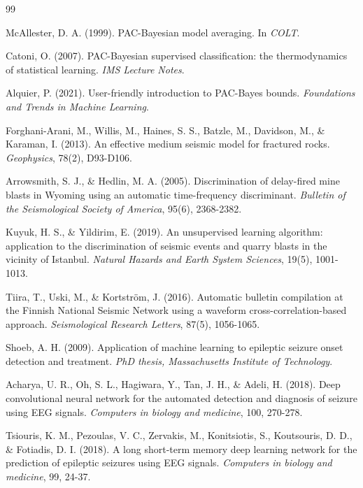\documentclass[11pt]{article}
\theoremstyle{remark}
\begin{document}
\begin{thebibliography}{99}

McAllester, D. A. (1999). PAC-Bayesian model averaging. In \emph{COLT}.

Catoni, O. (2007). PAC-Bayesian supervised classification: the thermodynamics of statistical learning. \emph{IMS Lecture Notes}.

Alquier, P. (2021). User-friendly introduction to PAC-Bayes bounds. \emph{Foundations and Trends in Machine Learning}.

Forghani-Arani, M., Willis, M., Haines, S. S., Batzle, M., Davidson, M., \& Karaman, I. (2013). An effective medium seismic model for fractured rocks. \emph{Geophysics}, 78(2), D93-D106.

Arrowsmith, S. J., \& Hedlin, M. A. (2005). Discrimination of delay-fired mine blasts in Wyoming using an automatic time-frequency discriminant. \emph{Bulletin of the Seismological Society of America}, 95(6), 2368-2382.

Kuyuk, H. S., \& Yildirim, E. (2019). An unsupervised learning algorithm: application to the discrimination of seismic events and quarry blasts in the vicinity of Istanbul. \emph{Natural Hazards and Earth System Sciences}, 19(5), 1001-1013.

Tiira, T., Uski, M., \& Kortström, J. (2016). Automatic bulletin compilation at the Finnish National Seismic Network using a waveform cross-correlation-based approach. \emph{Seismological Research Letters}, 87(5), 1056-1065.

Shoeb, A. H. (2009). Application of machine learning to epileptic seizure onset detection and treatment. \emph{PhD thesis, Massachusetts Institute of Technology}.

Acharya, U. R., Oh, S. L., Hagiwara, Y., Tan, J. H., \& Adeli, H. (2018). Deep convolutional neural network for the automated detection and diagnosis of seizure using EEG signals. \emph{Computers in biology and medicine}, 100, 270-278.

Tsiouris, Κ. M., Pezoulas, V. C., Zervakis, M., Konitsiotis, S., Koutsouris, D. D., \& Fotiadis, D. I. (2018). A long short-term memory deep learning network for the prediction of epileptic seizures using EEG signals. \emph{Computers in biology and medicine}, 99, 24-37.


\end{thebibliography}
\end{document}
